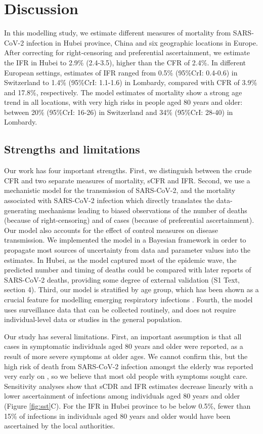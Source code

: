 \documentclass{article}
\begin{document}
\section*{Discussion}

In this modelling study, we estimate different measures of mortality from SARS-CoV-2 infection in Hubei province, China and six geographic locations in Europe. 
After correcting for right-censoring and preferential ascertainment, we estimate the IFR in Hubei to 2.9\% (2.4-3.5), higher than the CFR of 2.4\%. 
In different European settings, estimates of IFR ranged from 0.5\% (95\%CrI: 0.4-0.6) in Switzerland to 1.4\% (95\%CrI: 1.1-1.6) in Lombardy, compared with CFR of 3.9\% and 17.8\%, respectively. 
The model estimates of mortality show a strong age trend in all locations, with very high risks in people aged 80 years and older: between 20\% (95\%CrI: 16-26) in Switzerland and 34\% (95\%CrI: 28-40) in Lombardy. 

\subsection*{Strengths and limitations}

Our work has four important strengths. 
First, we distinguish between the crude CFR and two separate measures of mortality, sCFR and IFR.
Second, we use a mechanistic model for the transmission of SARS-CoV-2, and the mortality associated with SARS-CoV-2 infection which directly translates the data-generating mechanisms leading to biased observations of the number of deaths (because of right-censoring) and of cases (because of preferential ascertainment). 
Our model also accounts for the effect of control measures on disease transmission. 
We implemented the model in a Bayesian framework in order to propagate most sources of uncertainty from data and parameter values into the estimates.
In Hubei, as the model captured most of the epidemic wave, the predicted number and timing of deaths could be compared with later reports of SARS-CoV-2 deaths, providing some degree of external validation (S1 Text, section 4).
Third, our model is stratified by age group, which has been shown as a crucial feature for modelling emerging respiratory infections \cite{pellis2020systematic}. 
Fourth, the model uses surveillance data that can be collected routinely, and does not require individual-level data or studies in the general population. 

Our study has several limitations. 
First, an important assumption is that all cases in symptomatic individuals aged 80 years and older were reported, as a result of more severe symptoms at older ages. 
We cannot confirm this, but the high risk of death from SARS-CoV-2 infection amongst the elderly was reported very early on \cite{huang2020clinical}, so we believe that most old people with symptoms sought care. 
Sensitivity analyses show that sCDR and IFR estimates decrease linearly with a lower ascertainment of infections among individuals aged 80 years and older (Figure \ref{fig:sst}C). 
For the IFR in Hubei province to be below 0.5\%, fewer than 15\% of infections in individuals aged 80 years and older would have been ascertained by the local authorities.
\end{document}
